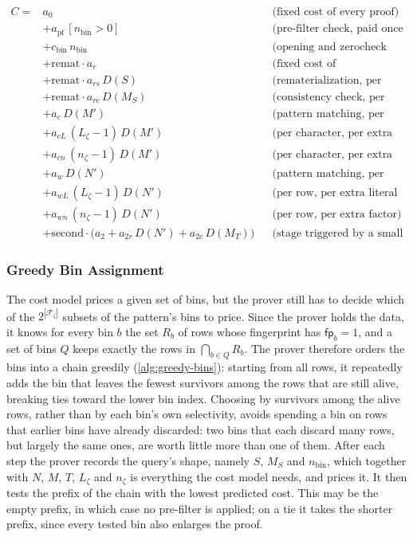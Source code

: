 \begin{align*}
  C = {}& a_0
    && \text{(fixed cost of every proof)} \\
  &+ a_{\mathrm{pf}}\, [n_{\mathrm{bin}} > 0]
    && \text{(pre-filter check, paid once if any bin is tested)} \\
  &+ c_{\mathrm{bin}}\, n_{\mathrm{bin}}
    && \text{(opening and zerocheck factor per tested bin)} \\
  &+ \mathrm{remat} \cdot a_r
    && \text{(fixed cost of rematerializing the survivors)} \\
  &+ \mathrm{remat} \cdot a_{rs}\, D(S)
    && \text{(rematerialization, per surviving row)} \\
  &+ \mathrm{remat} \cdot a_{rc}\, D(M_S)
    && \text{(consistency check, per surviving character)} \\
  &+ a_c\, D(M')
    && \text{(pattern matching, per input character)} \\
  &+ a_{cL}\, (L_\zeta - 1)\, D(M')
    && \text{(per character, per extra literal character)} \\
  &+ a_{cn}\, (n_\zeta - 1)\, D(M')
    && \text{(per character, per extra factor)} \\
  &+ a_w\, D(N')
    && \text{(pattern matching, per input row)} \\
  &+ a_{wL}\, (L_\zeta - 1)\, D(N')
    && \text{(per row, per extra literal character)} \\
  &+ a_{wn}\, (n_\zeta - 1)\, D(N')
    && \text{(per row, per extra factor)} \\
  &+ \mathrm{second} \cdot \bigl(a_2 + a_{2r}\, D(N') + a_{2c}\, D(M_T)\bigr)
    && \text{(stage triggered by a small match set).}
\end{align*}
\fi


\subsubsection{Greedy Bin Assignment}
\label{sec:greedy}
The cost model prices a given set of bins, but the prover still has to decide which of the $2^{|\mathcal{F}_\zeta|}$ subsets of the pattern's bins to price. Since the prover holds the data, it knows for every bin $b$ the set $R_b$ of rows whose fingerprint has $\mathsf{fp}_b = 1$, and a set of bins $Q$ keeps exactly the rows in $\bigcap_{b \in Q} R_b$. The prover therefore orders the bins into a chain greedily (\cref{alg:greedy-bins}): starting from all rows, it repeatedly adds the bin that leaves the fewest survivors among the rows that are still alive, breaking ties toward the lower bin index. Choosing by survivors among the alive rows, rather than by each bin's own selectivity, avoids spending a bin on rows that earlier bins have already discarded: two bins that each discard many rows, but largely the same ones, are worth little more than one of them. After each step the prover records the query's shape, namely $S$, $M_S$ and $n_{\mathrm{bin}}$, which together with $N$, $M$, $T$, $L_\zeta$ and $n_\zeta$ is everything the cost model needs, and prices it. It then tests the prefix of the chain with the lowest predicted cost. This may be the empty prefix, in which case no pre-filter is applied; on a tie it takes the shorter prefix, since every tested bin also enlarges the proof.

